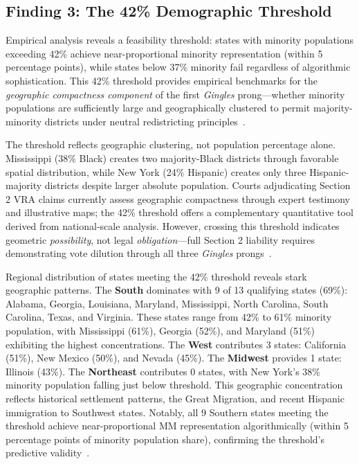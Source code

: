 \subsection{Finding 3: The 42\% Demographic Threshold}

Empirical analysis reveals a feasibility threshold: states with minority populations exceeding 42\% achieve near-proportional minority representation (within 5 percentage points), while states below 37\% minority fail regardless of algorithmic sophistication. This 42\% threshold provides empirical benchmarks for the \emph{geographic compactness component} of the first \emph{Gingles} prong---whether minority populations are sufficiently large and geographically clustered to permit majority-minority districts under neutral redistricting principles~\cite{deluca2026threshold}.

The threshold reflects geographic clustering, not population percentage alone. Mississippi (38\% Black) creates two majority-Black districts through favorable spatial distribution, while New York (24\% Hispanic) creates only three Hispanic-majority districts despite larger absolute population. Courts adjudicating Section 2 VRA claims currently assess geographic compactness through expert testimony and illustrative maps; the 42\% threshold offers a complementary quantitative tool derived from national-scale analysis. However, crossing this threshold indicates geometric \emph{possibility}, not legal \emph{obligation}---full Section 2 liability requires demonstrating vote dilution through all three \emph{Gingles} prongs~\cite{deluca2026threshold}.

Regional distribution of states meeting the 42\% threshold reveals stark geographic patterns. The \textbf{South} dominates with 9 of 13 qualifying states (69\%): Alabama, Georgia, Louisiana, Maryland, Mississippi, North Carolina, South Carolina, Texas, and Virginia. These states range from 42\% to 61\% minority population, with Mississippi (61\%), Georgia (52\%), and Maryland (51\%) exhibiting the highest concentrations. The \textbf{West} contributes 3 states: California (51\%), New Mexico (50\%), and Nevada (45\%). The \textbf{Midwest} provides 1 state: Illinois (43\%). The \textbf{Northeast} contributes 0 states, with New York's 38\% minority population falling just below threshold. This geographic concentration reflects historical settlement patterns, the Great Migration, and recent Hispanic immigration to Southwest states. Notably, all 9 Southern states meeting the threshold achieve near-proportional MM representation algorithmically (within 5 percentage points of minority population share), confirming the threshold's predictive validity~\cite{deluca2026threshold}.

